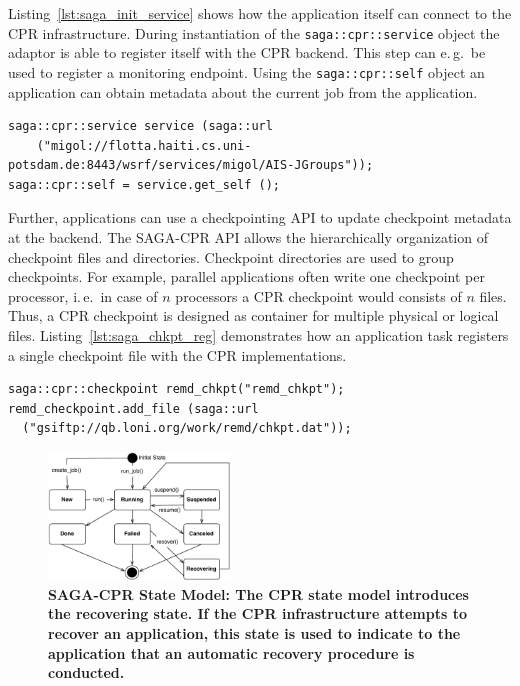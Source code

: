 \documentclass[times, 10pt, twocolumn]{article}
\newcommand{\up}{\vspace*{-1em}}
\begin{document}
Listing~\ref{lst:saga_init_service} shows how the application itself can connect to the CPR infrastructure. During instantiation of the \texttt{saga::cpr::service} object the adaptor is able to register itself with the CPR backend. This step can e.\,g.\ be used to register a monitoring endpoint. Using the \texttt{saga::cpr::self} object an application can obtain metadata about the current job from the application.                                                                               
\begin{lstlisting}[style=myListing, caption={\small \bf SAGA-CPR: Initialize Migol Session}, float=t, label={lst:saga_init_service}]
saga::cpr::service service (saga::url 
    ("migol://flotta.haiti.cs.uni-potsdam.de:8443/wsrf/services/migol/AIS-JGroups"));
saga::cpr::self = service.get_self ();
\end{lstlisting}

Further, applications can use a checkpointing API to update checkpoint metadata at the backend. The SAGA-CPR API allows the hierarchically 
organization of checkpoint files and directories. Checkpoint directories are 
used to group checkpoints. For example, parallel applications often write one checkpoint per 
processor, i.\,e.\ in case of $n$ processors a CPR checkpoint
would consists of $n$ files. Thus, a CPR checkpoint is designed as container 
for multiple physical or logical files. Listing~\ref{lst:saga_chkpt_reg} demonstrates 
how an application task registers a single checkpoint file with the CPR implementations.     
\begin{lstlisting}[style=myListing, caption={\small \bf SAGA-CPR: Register Checkpoint with Migol}, float=t, label={lst:saga_chkpt_reg}]
saga::cpr::checkpoint remd_chkpt("remd_chkpt");
remd_checkpoint.add_file (saga::url 
  ("gsiftp://qb.loni.org/work/remd/chkpt.dat"));
\end{lstlisting}

\begin{figure}[h!]
    \centering
        \includegraphics[width=0.43\textwidth]{cpr-statemodel.pdf}
    \caption{\small \bf SAGA-CPR State Model: The CPR state model introduces the recovering state. If the CPR infrastructure attempts to recover an application, this state is used to indicate to the application that an automatic recovery procedure is conducted.\up\up}
    \label{fig:cpr-statemodel}
\end{figure}
 
\end{document}

